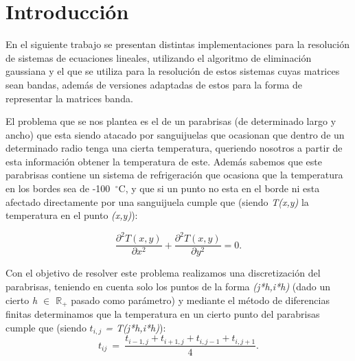 \documentclass[10pt, a4paper]{article}
\begin{document}




\maketitle
\thispagestyle{empty}
\tableofcontents

\newpage
\setcounter{page}{1}
\section{Introducci\'on}

En el siguiente trabajo se presentan distintas implementaciones para la resoluci\'on de sistemas de ecuaciones lineales, utilizando el algoritmo de eliminaci\'on gaussiana y el que se utiliza para la resoluci\'on de estos sistemas cuyas matrices sean bandas, adem\'as de versiones adaptadas de estos para la forma de representar la matrices banda.

El problema que se nos plantea es el de un parabrisas (de determinado largo y ancho) que esta siendo atacado por sanguijuelas que ocasionan que dentro de un determinado radio tenga una cierta temperatura, queriendo nosotros a partir de esta informaci\'on obtener la temperatura de este. Adem\'as sabemos que este parabrisas contiene un sistema de refrigeraci\'on que ocasiona que la temperatura en los bordes sea de -100\hspace{-1.5mm}$\phantom{a}^{\circ}$C, y que si un punto no esta en el borde ni esta afectado directamente por una sanguijuela cumple que (siendo \textit{T(x,y)} la temperatura en el punto \textit{(x,y)}):

\begin{equation}\label{eq:calor}
\frac{\partial^2T(x,y)}{\partial x^{2}}+\frac{\partial^2 T(x,y)}{\partial y^{2}} = 0.
\end{equation}

Con el objetivo de resolver este problema realizamos una discretizaci\'on del parabrisas, teniendo en cuenta solo los puntos de la forma \textit{(j*h,i*h)} (dado un cierto \textit{h $\in$ $\mathbb{R}_{+}$} pasado como par\'ametro) y mediante el m\'etodo de diferencias finitas determinamos que la temperatura en un cierto punto del parabrisas cumple que (siendo \textit{$t_{i,j}$ = T(j*h,i*h)}):
\begin{equation}
t_{ij} \ =\ \frac{ t_{i-1,j} + t_{i+1,j} + t_{i,j-1} + t_{i,j+1}}{4}.\label{eq:calordd}
\end{equation}
\end{document}
